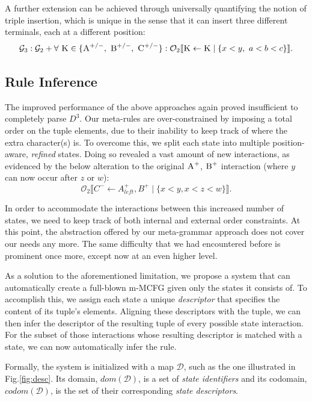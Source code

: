 \documentclass[nonatbib,numbers,10pt]{llncs}
\newcommand\s{\textsc}
\newcommand{\Orderr}[5]{
	\mathcal{#1}_{#5}\llbracket #2 \leftarrow #3 \mid \{ #4 \} \rrbracket.
}
\newcommand{\Or}[4]{\Orderr{O}{#1}{#2}{#3}{#4}}
\begin{document}
A further extension can be achieved through universally quantifying the notion of triple insertion, which is unique in the sense that it can insert three different terminals, each at a different position:
\[
\mathcal{G}_3: \mathcal{G}_2 + \forall \ \s{K} \in \{\textsc{A}^{+/-},\ \textsc{B}^{+/-},\ \textsc{C}^{+/-}\}: \Or{\s{K}}{\s{K}}{x < y,\ a < b < c}{2}
\]

\subsection{Rule Inference}\label{aris}	
The improved performance of the above approaches again proved insufficient to completely parse $D^3$. Our meta-rules are over-constrained by imposing a total order on the tuple elements, due to their inability to keep track of where the extra character(s) is. To overcome this, we split each state into multiple position-aware, \textit{refined} states. Doing so revealed a vast amount of new interactions, as evidenced by the below alteration to the original $\s{A}^+$, $\s{B}^+$ interaction (where $y$ can now occur after $z$ or $w$):
\[
\Or{C^-}{A^+_{left}, B^+}{x < y, x < z < w}{2}
\]

In order to accommodate the interactions between this increased number of states, we need to keep track of both internal and external order constraints. At this point, the abstraction offered by our meta-grammar approach does not cover our needs any more. The same difficulty that we had encountered before is prominent once more, except now at an even higher level. 

As a solution to the aforementioned limitation, we propose a system that can automatically create a full-blown m-MCFG given only the states it consists of. To accomplish this, we assign each state a unique \textit{descriptor} that specifies the content of its tuple's elements. Aligning these descriptors with the tuple, we can then infer the descriptor of the resulting tuple of every possible state interaction. For the subset of those interactions whose resulting descriptor is matched with a state, we can now automatically infer the rule.

Formally, the system is initialized with a map $\mathcal{D}$, such as the one illustrated in Fig.\ref{fig:desc}. Its domain, $dom(\mathcal{D})$, is a set of \textit{state identifiers} and its codomain, $codom(\mathcal{D})$, is the set of their corresponding \textit{state descriptors}.
\end{document}

